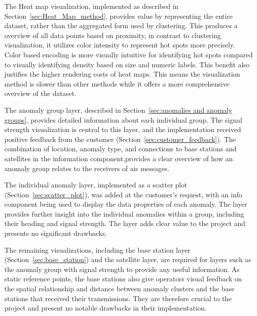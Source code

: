 The Heat map visualization, implemented as described in Section~\ref{sec:Heat_Map_method}, provides value by representing the entire dataset, rather than the aggregated form used by clustering. This produces a overview of all data points based on proximity, in contrast to clustering visualization, it utilizes color intensity to represent hot spots more precisely. Color based encoding is more visually intuitive for identifying hot spots compared to visually identifying density based on size and numeric labels. This benefit also justifies the higher rendering costs of heat maps. This means the visualization method is slower than other methods while it offers a more comprehensive overview of the dataset. %

The anomaly group layer, described in Section~\ref{sec:anomalies and anomaly groups}, provides detailed information about each individual group. The signal strength visualization is central to this layer, and the implementation received positive feedback from the customer (Section~\ref{sec:customer_feedback}). The combination of location, anomaly type, and connections to base stations and satellites in the information component,provides a clear overview of how an anomaly group relates to the receivers of \acrshort{ais} messages. 

The individual anomaly layer, implemented as a scatter plot (Section~\ref{sec:scatter_plot}), was added at the customer's request, with an info component being used to display the data properties of each anomaly. The layer provides further insight into the individual anomalies within a group, including their heading and signal strength. The layer adds clear value to the project and presents no significant drawbacks. 

The remaining visualizations, including the base station layer (Section~\ref{sec:base_station}) and the satellite layer, are required for layers such as the anomaly group with signal strength to provide any useful information. As static reference points, the base stations also give operators visual feedback on the spatial relationship and distance between anomaly clusters and the base stations that received their transmissions. They are therefore crucial to the project and present no notable drawbacks in their implementation.

